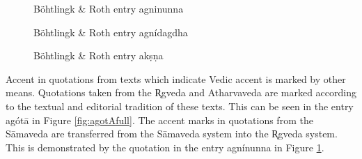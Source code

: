 \begin{figure}[!ht]
\begin{center}
\end{center}
\caption[Böhtlingk \& Roth entry agnínunna]{\label{fig:agninunna}Böhtlingk \& Roth entry agninunna}
\end{figure}

\begin{figure}[!ht]
\begin{center}
\end{center}
\caption[Böhtlingk \& Roth entry agnídagdha]{\label{fig:agnidagDa}Böhtlingk \& Roth entry agnídagdha}
\end{figure}

\begin{figure}[!ht]
\begin{center}
\end{center}
\caption[Böhtlingk \& Roth entry akṣṇa]{\label{fig:akSNaya}Böhtlingk \& Roth entry akṣṇa}
\end{figure}

Accent in quotations from texts which indicate Vedic accent is marked by other means. Quotations taken from the R̥gveda and Atharvaveda are marked according to the textual and editorial tradition of these texts. This can be seen in the entry agótā in Figure \ref{fig:agotAfull}. The accent marks in quotations from the Sāmaveda are transferred from the Sāmaveda system into the R̥gveda system. This is demonstrated by the quotation in the entry agnínunna in Figure \ref{fig:agninunna}.

